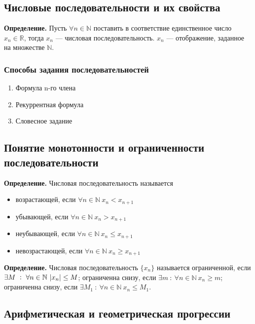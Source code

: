 \documentclass{article}
\begin{document}
    \subsection{Числовые последовательности и их свойства}
    
    \textbf{Определение.} Пусть \(\forall n \in \mathbb{N}\) поставить в соответствие единственное число \(x_n \in \mathbb{R}\), тогда \(x_n\) --- числовая последовательность. \(x_n\) --- отображение, заданное на множестве \(\mathbb{N}\).
    
    \subsubsection{Способы задания последовательностей}
    
    \begin{enumerate}
    	\item Формула n-го члена
        \item Рекуррентная формула
        \item Словесное задание
    \end{enumerate}
    
    \subsection{Понятие монотонности и ограниченности последовательности}
    
    \textbf{Определение.} Числовая последовательность называется
    \begin{itemize}
    	\item возрастающей, если \(\forall n \in \mathbb{N}\ x_n < x_{n+1}\)
        \item убывающей, если \(\forall n \in \mathbb{N}\ x_n > x_{n+1}\)
        \item неубывающей, если \(\forall n \in \mathbb{N}\ x_n \leq x_{n+1}\)
        \item невозрастающей, если \(\forall n \in \mathbb{N}\ x_n \geq x_{n+1}\)
  	\end{itemize}
    
    \textbf{Определение.} Числовая последовательность \(\{x_n\}\) называется ограниченной, если \(\exists M\ :\ \forall n \in \mathbb{N}\ \abs{x_n} \leq M\); ограниченна снизу, если \(\exists m\ :\ \forall n \in \mathbb{N}\ x_n \geq m\); ограниченна снизу, если \(\exists M_1\ :\ \forall n \in \mathbb{N}\ x_n \leq M_1\).
    
    \subsection{Арифметическая и геометрическая прогрессии}
    
\end{document}
